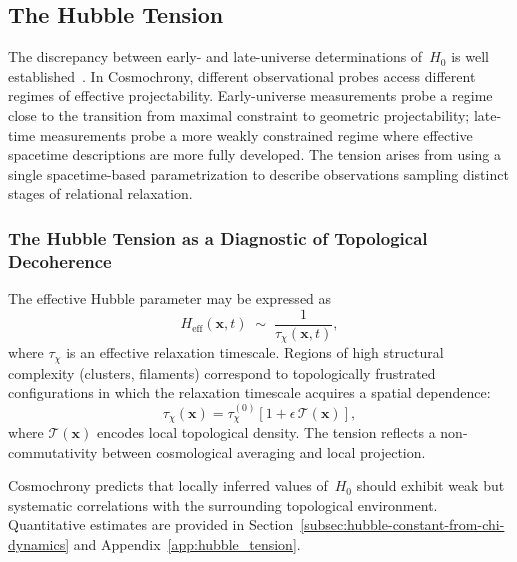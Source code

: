 \subsection{The Hubble Tension}
\label{subsec:hubble-tension}

The discrepancy between early- and late-universe determinations of~$H_0$
is well
established~\cite{Riess2019,Riess2022,Planck2020,HubbleTensionReview}.
In Cosmochrony, different observational probes access different regimes
of effective projectability.
Early-universe measurements probe a regime close to the transition from
maximal constraint to geometric projectability; late-time measurements
probe a more weakly constrained regime where effective spacetime
descriptions are more fully developed.
The tension arises from using a single spacetime-based parametrization to
describe observations sampling distinct stages of relational relaxation.

\subsubsection*{The Hubble Tension as a Diagnostic of Topological
Decoherence}
\label{subsec:hubble_tension_tau}

The effective Hubble parameter may be expressed as
\begin{equation}
  H_{\mathrm{eff}}(\mathbf{x}, t)
    \;\sim\; \frac{1}{\tau_\chi(\mathbf{x}, t)} ,
\end{equation}
where $\tau_\chi$ is an effective relaxation timescale.
Regions of high structural complexity (clusters, filaments) correspond to
topologically frustrated configurations in which the relaxation timescale
acquires a spatial dependence:
\begin{equation}
  \tau_\chi(\mathbf{x})
  = \tau_\chi^{(0)}
    \left[1 + \epsilon\, \mathcal{T}(\mathbf{x})\right] ,
\end{equation}
where $\mathcal{T}(\mathbf{x})$ encodes local topological density.
The tension reflects a non-commutativity between cosmological averaging
and local projection.

Cosmochrony predicts that locally inferred values of~$H_0$ should exhibit
weak but systematic correlations with the surrounding topological
environment.
Quantitative estimates are provided in
Section~\ref{subsec:hubble-constant-from-chi-dynamics} and
Appendix~\ref{app:hubble_tension}.
